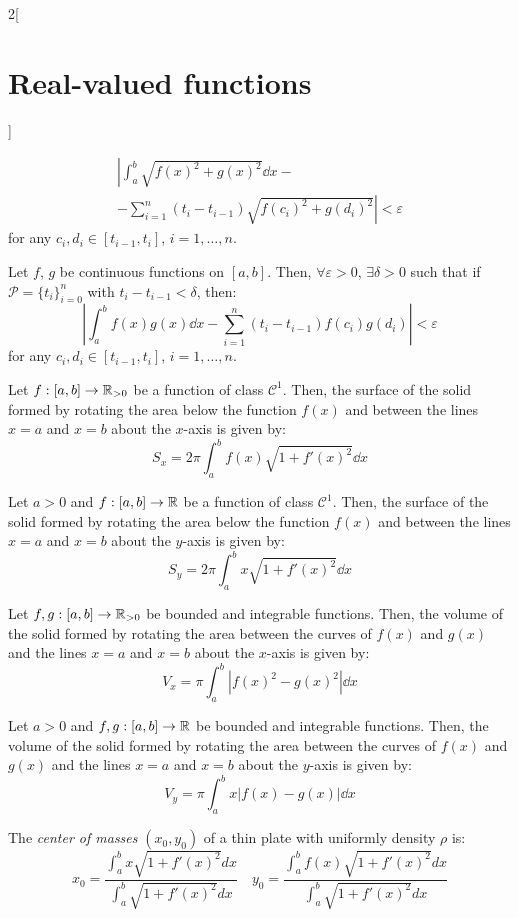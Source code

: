 \documentclass[../../../main.tex]{subfiles}
\begin{document}
\begin{multicols}{2}[\section{Real-valued functions}]
\begin{lemma}
\begin{multline*}
      \left|\int_a^b\sqrt{{f(x)}^2+{g(x)}^2}\dd{x}\right.-\\-\left.\sum_{i=1}^n(t_i-t_{i-1})\sqrt{{f(c_i)}^2+{g(d_i)}^2}\right|<\varepsilon
    \end{multline*}
    for any $c_i,d_i\in[t_{i-1},t_i]$, $i=1,\ldots,n$.
  \end{lemma}
  \begin{lemma}
    Let $f$, $g$ be continuous functions on $[a,b]$. Then, $\forall\varepsilon>0$, $\exists\delta>0$ such that if $\mathcal{P}=\{t_i\}_{i=0}^n$ with $t_i-t_{i-1}<\delta$, then:
    $$\left|\int_a^bf(x)g(x)\dd{x}-\sum_{i=1}^n(t_i-t_{i-1})f(c_i)g(d_i)\right|<\varepsilon$$
    for any $c_i,d_i\in[t_{i-1},t_i]$, $i=1,\ldots,n$.
  \end{lemma}
  \begin{proposition}
    Let $f:[a,b]\rightarrow\mathbb{R}_{>0}$ be a function of class $\mathcal{C}^1$. Then, the surface of the solid formed by rotating the area below the function $f(x)$ and between the lines $x = a$ and $x = b$ about the $x$-axis is given by: $$S_x=2\pi\int_a^bf(x)\sqrt{1+{f'(x)}^2}\dd{x}$$
  \end{proposition}
  \begin{proposition}
    Let $a>0$ and $f:[a,b]\rightarrow\mathbb{R}$ be a function of class $\mathcal{C}^1$. Then, the surface of the solid formed by rotating the area below the function $f(x)$ and between the lines $x = a$ and $x = b$ about the $y$-axis is given by: $$S_y=2\pi\int_a^bx\sqrt{1+{f'(x)}^2}\dd{x}$$
  \end{proposition}
  \begin{proposition}
    Let $f,g:[a,b]\rightarrow\mathbb{R}_{>0}$ be bounded and integrable functions. Then, the volume of the solid formed by rotating the area between the curves of $f(x)$ and $g(x)$ and the lines $x = a$ and $x = b$ about the $x$-axis is given by: $$V_x=\pi\int_a^b\left|{f(x)}^2-{g(x)}^2\right|\dd{x}$$
  \end{proposition}
  \begin{proposition}
    Let $a>0$ and $f,g:[a,b]\rightarrow\mathbb{R}$ be bounded and integrable functions. Then, the volume of the solid formed by rotating the area between the curves of $f(x)$ and $g(x)$ and the lines $x = a$ and $x = b$ about the $y$-axis is given by: $$V_y=\pi\int_a^bx\left|f(x)-g(x)\right|\dd{x}$$
  \end{proposition}
  \begin{proposition}
    The \emph{center of masses} $(x_0,y_0)$ of a thin plate with uniformly density $\rho$ is: $$x_0=\frac{\displaystyle\int_a^bx\sqrt{1+{f'(x)}^2}dx}{\displaystyle\int_a^b\sqrt{1+{f'(x)}^2}dx}\quad y_0=\frac{\displaystyle\int_a^b f(x)\sqrt{1+{f'(x)}^2}dx}{\displaystyle\int_a^b\sqrt{1+{f'(x)}^2}dx}$$
  \end{proposition}

\end{multicols}
\end{document}
